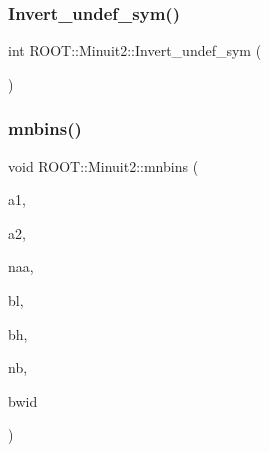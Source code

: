 \subsubsection{\texorpdfstring{Invert\_undef\_sym()}{Invert\_undef\_sym()}}
{\footnotesize\ttfamily int R\+O\+O\+T\+::\+Minuit2\+::\+Invert\+\_\+undef\+\_\+sym (\begin{DoxyParamCaption}\item[{\mbox{\hyperlink{classROOT_1_1Minuit2_1_1LASymMatrix}{L\+A\+Sym\+Matrix}} \&}]{ }\end{DoxyParamCaption})}

\mbox{\label{namespaceROOT_1_1Minuit2_ac22433ee68c6274fa7028a58763d04bd}} 
\subsubsection{\texorpdfstring{mnbins()}{mnbins()}}
{\footnotesize\ttfamily void R\+O\+O\+T\+::\+Minuit2\+::mnbins (\begin{DoxyParamCaption}\item[{double}]{a1,  }\item[{double}]{a2,  }\item[{int}]{naa,  }\item[{double \&}]{bl,  }\item[{double \&}]{bh,  }\item[{int \&}]{nb,  }\item[{double \&}]{bwid }\end{DoxyParamCaption})}

